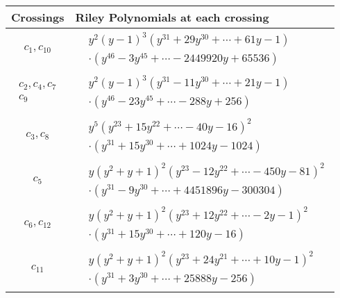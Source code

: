 \documentclass[1p]{elsarticle_modified}
\theoremstyle{definition}
\begin{document}
\begin{tabular}{m{50pt}|m{274pt}}
Crossings & \hspace{64pt}Riley Polynomials at each crossing \\
\hline $$\begin{aligned}c_{1},c_{10}\end{aligned}$$&$\begin{aligned}
&y^2(y-1)^3(y^{31}+29 y^{30}+\cdots+61 y-1)\\
&\cdot(y^{46}-3 y^{45}+\cdots-2449920 y+65536)
\end{aligned}$\\
\hline $$\begin{aligned}c_{2},c_{4},c_{7}\\c_{9}\end{aligned}$$&$\begin{aligned}
&y^2(y-1)^3(y^{31}-11 y^{30}+\cdots+21 y-1)\\
&\cdot(y^{46}-23 y^{45}+\cdots-288 y+256)
\end{aligned}$\\
\hline $$\begin{aligned}c_{3},c_{8}\end{aligned}$$&$\begin{aligned}
&y^5(y^{23}+15 y^{22}+\cdots-40 y-16)^{2}\\
&\cdot(y^{31}+15 y^{30}+\cdots+1024 y-1024)
\end{aligned}$\\
\hline $$\begin{aligned}c_{5}\end{aligned}$$&$\begin{aligned}
&y(y^2+y+1)^2(y^{23}-12 y^{22}+\cdots-450 y-81)^{2}\\
&\cdot(y^{31}-9 y^{30}+\cdots+4451896 y-300304)
\end{aligned}$\\
\hline $$\begin{aligned}c_{6},c_{12}\end{aligned}$$&$\begin{aligned}
&y(y^2+y+1)^2(y^{23}+12 y^{22}+\cdots-2 y-1)^{2}\\
&\cdot(y^{31}+15 y^{30}+\cdots+120 y-16)
\end{aligned}$\\
\hline $$\begin{aligned}c_{11}\end{aligned}$$&$\begin{aligned}
&y(y^2+y+1)^2(y^{23}+24 y^{21}+\cdots+10 y-1)^{2}\\
&\cdot(y^{31}+3 y^{30}+\cdots+25888 y-256)
\end{aligned}$\\
\hline
\end{tabular}
\vskip 2pc
\end{document}
